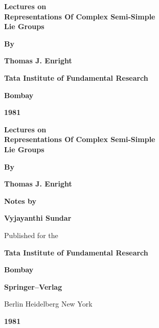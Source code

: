 \thispagestyle{empty}

\begin{center}
{\Large\bf Lectures on}\\[5pt]
{\Large\bf Representations Of Complex Semi-Simple}\\[5pt]
{\Large\bf Lie Groups}
\vskip 1cm

\vfill


{\bf By}
\medskip

{\large\bf Thomas J. Enright}
\vfill

{\bf Tata Institute of Fundamental Research}
\medskip

{\bf Bombay}
\medskip

{\bf 1981}
\end{center}
\eject

\thispagestyle{empty}
\begin{center}
{\Large\bf Lectures on}\\[5pt]
{\Large\bf Representations Of Complex Semi-Simple}\\[5pt]
{\Large\bf Lie Groups}
\vskip 1cm

\vfill


{\bf By}
\medskip

{\large\bf Thomas J. Enright}
\vfill

{\bf Notes by}
\medskip

{\large\bf Vyjayanthi Sundar}
\vfill

Published for the 
\medskip

{\bf Tata Institute of Fundamental Research}
\medskip

{\bf Bombay}
\bigskip

{\bf Springer--Verlag}
\medskip

Berlin Heidelberg New York
\medskip


{\bf 1981}
\end{center}
\eject


